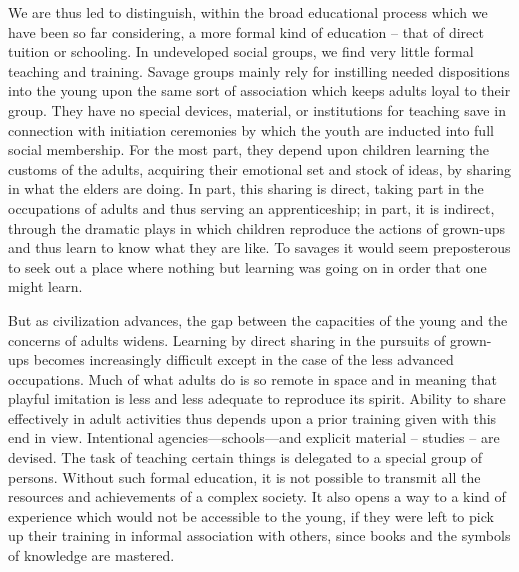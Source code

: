 \begin{linenumbers*}
\indent We are thus led to distinguish, within the broad educational process which we have been so far considering, a more formal kind of education -- that of direct tuition or schooling. In undeveloped social groups, we find very little formal teaching and training. Savage groups mainly rely for instilling needed dispositions into the young upon the same sort of association which keeps adults loyal to their group. They have no special devices, material, or institutions for teaching save in connection with initiation ceremonies by which the youth are inducted into full social membership. For the most part, they depend upon children learning the customs of the adults, acquiring their emotional set and stock of ideas, by sharing in what the elders are doing. In part, this sharing is direct, taking part in the occupations of adults and thus serving an apprenticeship; in part, it is indirect, through the dramatic plays in which children reproduce the actions of grown-ups and thus learn to know what they are like. To savages it would seem preposterous to seek out a place where nothing but learning was going on in order that one might learn.

\indent But as civilization advances, the gap between the capacities of the young and the concerns of adults widens. Learning by direct sharing in the pursuits of grown-ups becomes increasingly difficult except in the case of the less advanced occupations. Much of what adults do is so remote in space and in meaning that playful imitation is less and less adequate to reproduce its spirit. Ability to share effectively in adult activities thus depends upon a prior training given with this end in view. Intentional agencies—schools—and explicit material -- studies -- are devised. The task of teaching certain things is delegated to a special group of persons.
Without such formal education, it is not possible to transmit all the resources and achievements of a complex society. It also opens a way to a kind of experience which would not be accessible to the young, if they were left to pick up their training in informal association with others, since books and the symbols of knowledge are mastered.


\end{linenumbers*}
